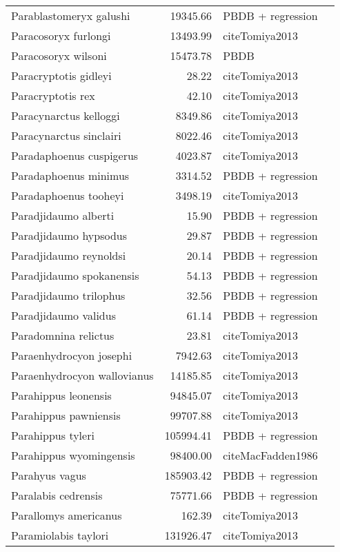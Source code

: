 \begin{table}[ht]
\begin{tabular}{lrll}
  Parablastomeryx galushi & 19345.66 & PBDB + regression &  \\ 
  Paracosoryx furlongi & 13493.99 & cite{Tomiya2013} &  \\ 
  Paracosoryx wilsoni & 15473.78 & PBDB &  \\ 
  Paracryptotis gidleyi & 28.22 & cite{Tomiya2013} &  \\ 
  Paracryptotis rex & 42.10 & cite{Tomiya2013} &  \\ 
  Paracynarctus kelloggi & 8349.86 & cite{Tomiya2013} &  \\ 
  Paracynarctus sinclairi & 8022.46 & cite{Tomiya2013} &  \\ 
  Paradaphoenus cuspigerus & 4023.87 & cite{Tomiya2013} &  \\ 
  Paradaphoenus minimus & 3314.52 & PBDB + regression &  \\ 
  Paradaphoenus tooheyi & 3498.19 & cite{Tomiya2013} &  \\ 
  Paradjidaumo alberti & 15.90 & PBDB + regression &  \\ 
  Paradjidaumo hypsodus & 29.87 & PBDB + regression &  \\ 
  Paradjidaumo reynoldsi & 20.14 & PBDB + regression &  \\ 
  Paradjidaumo spokanensis & 54.13 & PBDB + regression &  \\ 
  Paradjidaumo trilophus & 32.56 & PBDB + regression &  \\ 
  Paradjidaumo validus & 61.14 & PBDB + regression &  \\ 
  Paradomnina relictus & 23.81 & cite{Tomiya2013} &  \\ 
  Paraenhydrocyon josephi & 7942.63 & cite{Tomiya2013} &  \\ 
  Paraenhydrocyon wallovianus & 14185.85 & cite{Tomiya2013} &  \\ 
  Parahippus leonensis & 94845.07 & cite{Tomiya2013} &  \\ 
  Parahippus pawniensis & 99707.88 & cite{Tomiya2013} &  \\ 
  Parahippus tyleri & 105994.41 & PBDB + regression &  \\ 
  Parahippus wyomingensis & 98400.00 & cite{MacFadden1986} &  \\ 
  Parahyus vagus & 185903.42 & PBDB + regression &  \\ 
  Paralabis cedrensis & 75771.66 & PBDB + regression &  \\ 
  Parallomys americanus & 162.39 & cite{Tomiya2013} &  \\ 
  Paramiolabis taylori & 131926.47 & cite{Tomiya2013} &  \\ 

\end{tabular}
\end{table}
